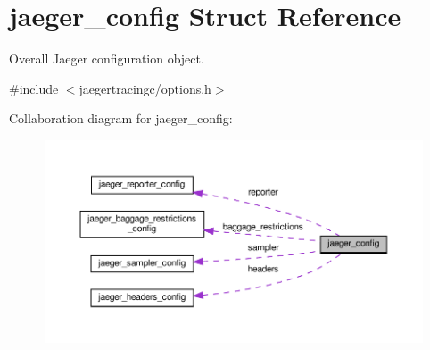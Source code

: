 \hypertarget{structjaeger__config}{}\section{jaeger\+\_\+config Struct Reference}
\label{structjaeger__config}


Overall Jaeger configuration object.  




{\ttfamily \#include $<$jaegertracingc/options.\+h$>$}



Collaboration diagram for jaeger\+\_\+config\+:\nopagebreak
\begin{figure}[H]
\begin{center}
\leavevmode
\includegraphics[width=350pt]{structjaeger__config__coll__graph}
\end{center}
\end{figure}
